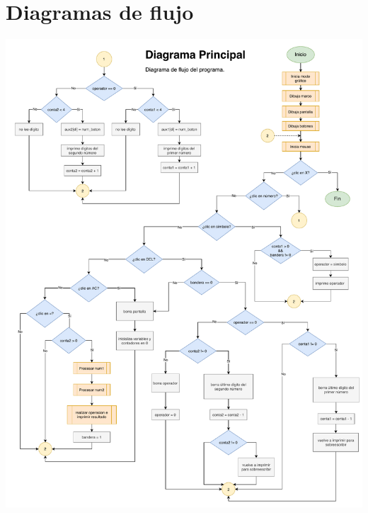 \documentclass[letterpaper,12 pt,titlepage]{article}
\begin{document}
    \section{Diagramas de flujo}
    \begin{center} 
        \includegraphics[width=1\textwidth]{img/diagramas/p02.pdf}


\end{center}
\end{document}
